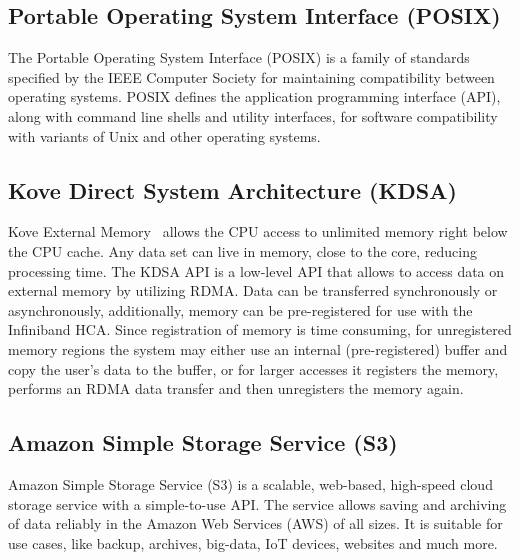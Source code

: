 \subsection{Portable Operating System Interface (POSIX)}
The Portable Operating System Interface (POSIX) is a family of standards specified by the IEEE Computer Society for maintaining compatibility between operating systems.
POSIX defines the application programming interface (API), along with command line shells and utility interfaces, for software compatibility with variants of Unix and other operating systems.

\subsection{Kove Direct System Architecture (KDSA)}
Kove External Memory~\cite{10.1007/978-3-319-67630-2_48} allows the CPU access to unlimited memory right below the CPU cache. 
Any data set can live in memory, close to the core, reducing processing time.
The KDSA API is a low-level API that allows to access data on external memory by utilizing RDMA. 
Data can be transferred synchronously or asynchronously, additionally, memory can be pre-registered for use with the Infiniband HCA. 
Since registration of memory is time consuming, for unregistered memory regions the system may either use an internal (pre-registered) buffer and copy the user’s data to the buffer, or for larger accesses it registers the memory, performs an RDMA data transfer and then unregisters the memory again.

\subsection{Amazon Simple Storage Service (S3)} 
Amazon Simple Storage Service (S3) is a scalable, web-based, high-speed cloud storage service with a simple-to-use API.
The service allows saving and archiving of data reliably in the Amazon Web Services (AWS) of all sizes.
It is suitable for use cases, like backup, archives, big-data, IoT devices, websites and much more.
